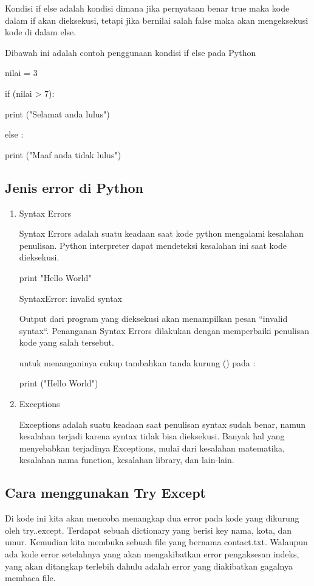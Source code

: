 Kondisi if else adalah kondisi dimana jika pernyataan benar true maka kode dalam if akan dieksekusi, tetapi jika bernilai salah false maka akan mengeksekusi kode di dalam else.

Dibawah ini adalah contoh penggunaan kondisi if else pada Python

nilai = 3

if (nilai > 7):

	print ("Selamat anda lulus")

else :

	print ("Maaf anda tidak lulus")

\subsection{Jenis error di Python}

\begin{enumerate}
\item Syntax Errors

Syntax Errors adalah suatu keadaan saat kode python mengalami kesalahan penulisan. Python interpreter dapat mendeteksi kesalahan ini saat kode dieksekusi.

print "Hello World"

SyntaxError: invalid syntax

Output dari program yang dieksekusi akan menampilkan pesan “invalid syntax“. Penanganan Syntax Errors dilakukan dengan memperbaiki penulisan kode yang salah tersebut. 

untuk menanganinya cukup tambahkan tanda kurung () pada :

print ("Hello World") 

\item Exceptions

Exceptions adalah suatu keadaan saat penulisan syntax sudah benar, namun kesalahan terjadi karena syntax tidak bisa dieksekusi. Banyak hal yang menyebabkan terjadinya Exceptions, mulai dari kesalahan matematika, kesalahan nama function, kesalahan library, dan lain-lain.
\end{enumerate}

\subsection{Cara menggunakan Try Except}

Di kode ini kita akan mencoba menangkap dua error pada kode yang dikurung oleh try..except. Terdapat sebuah dictionary yang berisi key nama, kota, dan umur. Kemudian kita membuka sebuah file yang bernama contact.txt. Walaupun ada kode error setelahnya yang akan mengakibatkan error pengaksesan indeks, yang akan ditangkap terlebih dahulu adalah error yang diakibatkan gagalnya membaca file.

